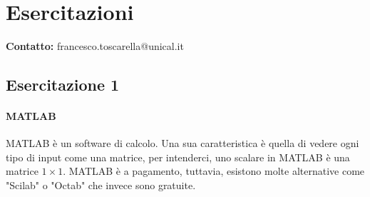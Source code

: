 \chapter{Esercitazioni}
\textbf{Contatto: } francesco.toscarella@unical.it
\newline
\section{Esercitazione 1}
\subsubsection{MATLAB}
MATLAB è un software di calcolo. Una sua caratteristica è quella di vedere ogni tipo di input come una matrice, per intenderci, uno scalare in MATLAB è una matrice $1\times 1$.
MATLAB è a pagamento, tuttavia, esistono molte alternative come "Scilab" o "Octab" che invece sono gratuite.
